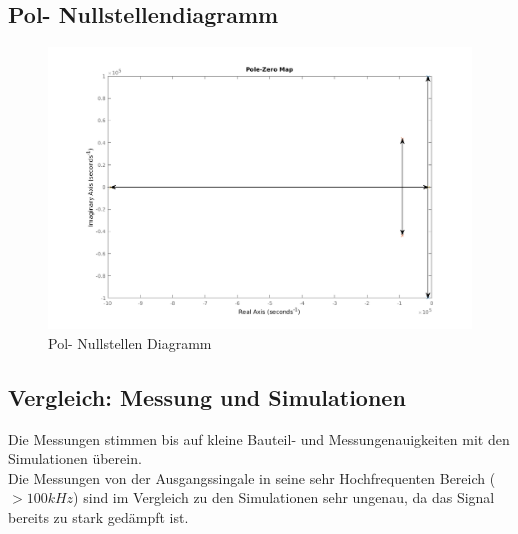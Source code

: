 \subsection{Pol- Nullstellendiagramm}

\begin{figure}[H]
  \begin{center}
    \includegraphics[width=1\textwidth]{./PoleZeroMap.png}
    \caption{Pol- Nullstellen Diagramm}
  \end{center}
\end{figure}
\noindent

\subsection{Vergleich: Messung und Simulationen}
Die Messungen stimmen bis auf kleine Bauteil- und Messungenauigkeiten mit den Simulationen \"uberein. \\
Die Messungen von der Ausgangssingale in seine sehr Hochfrequenten Bereich ($>100kHz$) sind im Vergleich zu den Simulationen sehr ungenau, da das Signal bereits zu stark ged\"ampft ist.
